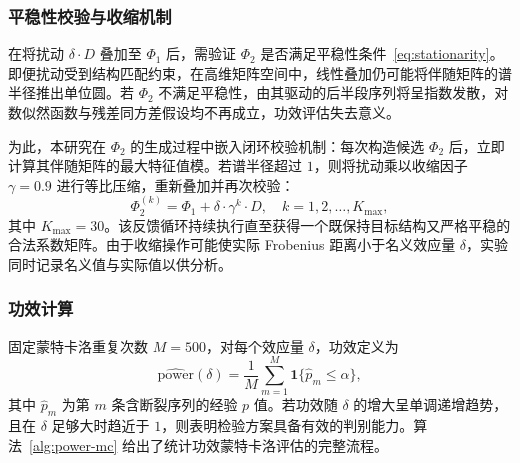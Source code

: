 \subsubsection{平稳性校验与收缩机制}

在将扰动 $\delta \cdot D$ 叠加至 $\Phi_1$ 后，需验证 $\Phi_2$ 是否满足平稳性条件~\eqref{eq:stationarity}。即便扰动受到结构匹配约束，在高维矩阵空间中，线性叠加仍可能将伴随矩阵的谱半径推出单位圆。若 $\Phi_2$ 不满足平稳性，由其驱动的后半段序列将呈指数发散，对数似然函数与残差同方差假设均不再成立，功效评估失去意义。

为此，本研究在 $\Phi_2$ 的生成过程中嵌入闭环校验机制：每次构造候选 $\Phi_2$ 后，立即计算其伴随矩阵的最大特征值模。若谱半径超过 $1$，则将扰动乘以收缩因子 $\gamma = 0.9$ 进行等比压缩，重新叠加并再次校验：
\begin{equation}\label{eq:shrinkage}
    \Phi_2^{(k)} = \Phi_1 + \delta \cdot \gamma^k \cdot D, \quad k = 1, 2, \ldots, K_{\max},
\end{equation}
其中 $K_{\max} = 30$。该反馈循环持续执行直至获得一个既保持目标结构又严格平稳的合法系数矩阵。由于收缩操作可能使实际 Frobenius 距离小于名义效应量 $\delta$，实验同时记录名义值与实际值以供分析。

\subsubsection{功效计算}

固定蒙特卡洛重复次数 $M = 500$，对每个效应量 $\delta$，功效定义为
\begin{equation}\label{eq:power}
    \widehat{\mathrm{power}}(\delta) = \frac{1}{M} \sum_{m=1}^{M} \mathbf{1}\{\hat{p}_m \leq \alpha\},
\end{equation}
其中 $\hat{p}_m$ 为第 $m$ 条含断裂序列的经验 $p$ 值。若功效随 $\delta$ 的增大呈单调递增趋势，且在 $\delta$ 足够大时趋近于 $1$，则表明检验方案具备有效的判别能力。算法~\ref{alg:power-mc} 给出了统计功效蒙特卡洛评估的完整流程。

